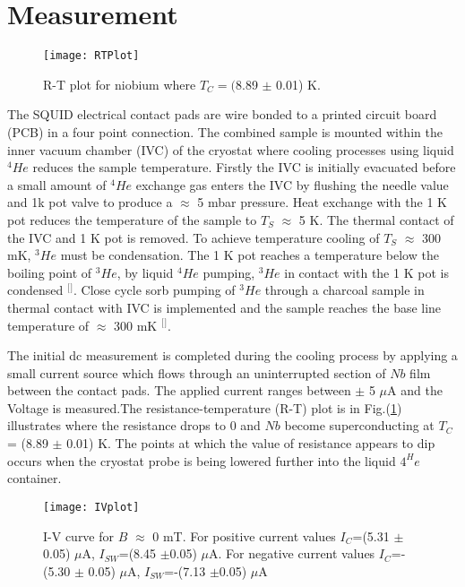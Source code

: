 \section{\label{sec:level1}Measurement}

\begin{figure}[b]
\centering
\texttt{[image: RTPlot]}
\caption{\label{fig:RTPlot}R-T plot for niobium where $T_C$$ = ($8.89 $\pm$ 0.01) K.}
\end{figure}

The SQUID electrical contact pads are wire bonded to a printed circuit board (PCB) in a four point connection. The combined sample is mounted within the inner vacuum chamber (IVC) of the cryostat where cooling processes using liquid ${}^4He$ reduces the sample temperature. Firstly the IVC is initially evacuated before a small amount of ${}^4He$ exchange gas enters the IVC by flushing the needle value and 1k pot valve to produce a $\approx$ 5 mbar pressure. Heat exchange with the 1 K pot reduces the temperature of the sample to $T_S$ $\approx$ 5 K. The thermal contact of the IVC and 1 K pot is removed. To achieve temperature cooling of $T_S$ $\approx$ 300 mK, ${}^3He$ must be condensation. The 1 K pot reaches a temperature below the boiling point of ${}^3He$, by liquid $^4He$ pumping, $^3He$ in contact with the 1 K pot is condensed $^[$\citep{HeManual}$^]$. Close cycle sorb pumping of $^3He$ through a charcoal sample in thermal contact with IVC is implemented and the sample reaches the base line temperature of $\approx$ 300 mK $^[$\citep{HeManual}$^]$. 

The initial dc measurement is completed during the cooling process by applying a small current source which flows through an uninterrupted section of $Nb$ film between the contact pads. The applied current ranges between $\pm$ 5 $\mu$A and the Voltage is measured.The resistance-temperature (R-T) plot is in Fig.(\ref{fig:RTPlot}) illustrates where the resistance drops to 0 and $Nb$ become superconducting at $T_C$ = (8.89 $\pm$ 0.01) K. The points at which the value of resistance appears to dip occurs when the cryostat probe is being lowered further into the liquid $4^He$ container.

\begin{figure}[t]
\centering
\texttt{[image: IVplot]}
\caption{\label{fig:IVplot}I-V curve for $B$ $\approx$ 0 mT. For positive current values $I_C$=(5.31 $\pm$0.05) $\mu$A, $I_{SW}$=(8.45 $\pm$0.05) $\mu$A. For negative current values $I_C$=-(5.30 $\pm$ 0.05) $\mu$A, $I_{SW}$=-(7.13 $\pm$0.05) $\mu$A}
\end{figure} 

